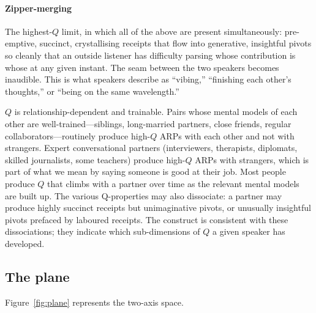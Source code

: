 \paragraph{Zipper-merging} The highest-$Q$ limit, in which all of the above are present simultaneously: pre-emptive, succinct, crystallising receipts that flow into generative, insightful pivots so cleanly that an outside listener has difficulty parsing whose contribution is whose at any given instant. The seam between the two speakers becomes inaudible. This is what speakers describe as ``vibing,'' ``finishing each other's thoughts,'' or ``being on the same wavelength.''

$Q$ is relationship-dependent and trainable. Pairs whose mental models of each other are well-trained---siblings, long-married partners, close friends, regular collaborators---routinely produce high-$Q$ ARPs with each other and not with strangers. Expert conversational partners (interviewers, therapists, diplomats, skilled journalists, some teachers) produce high-$Q$ ARPs with strangers, which is part of what we mean by saying someone is good at their job. Most people produce $Q$ that climbs with a partner over time as the relevant mental models are built up. The various Q-properties may also dissociate: a partner may produce highly succinct receipts but unimaginative pivots, or unusually insightful pivots prefaced by laboured receipts. The construct is consistent with these dissociations; they indicate which sub-dimensions of $Q$ a given speaker has developed.

\subsection{The plane}

Figure~\ref{fig:plane} represents the two-axis space.

